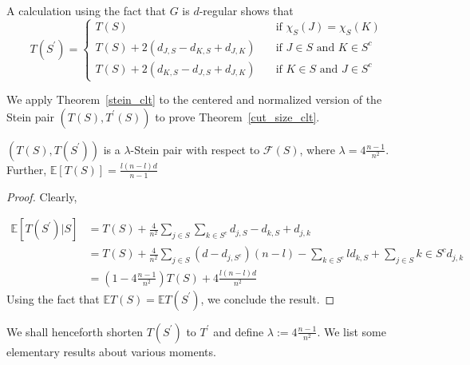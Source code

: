 \documentclass[final,12pt]{colt2018}
\begin{document}
A calculation using the fact that $G$ is $d$-regular shows that
\begin{equation}
T(S^{\prime}) = \begin{cases}
T(S) &\quad \text{if $\chi_S (J) = \chi_S(K)$} \\
T(S) + 2(d_{J,S} - d_{K,S} + d_{J,K}) &\quad \text{if $J \in S$ and $K \in S^{c}$} \\
T(S) + 2(d_{K,S} - d_{J,S} + d_{J,K}) &\quad \text{if $K \in S$ and $J \in S^{c}$}
\end{cases}
\end{equation}

We apply Theorem~\ref{stein_clt} to the centered and normalized version of the Stein pair $(T(S), T^{\prime}(S))$ to prove Theorem~\ref{cut_size_clt}. 

\label{sec:clt_proof}

\begin{lemma}
$(T(S),T(S^{\prime}))$ is a $\lambda$-Stein pair with respect to $\mathcal{F}(S)$, where $\lambda = 4\frac{n-1}{n^2}$. Further, $\mathbb{E}[T(S)] = \tfrac{l(n-l)d}{n-1} $
\label{lem:expectation_stein_pair}
\end{lemma}
\begin{proof}
Clearly,

\begin{align}
\mathbb{E}[T(S^{\prime})|S] &= T(S) + \tfrac{4}{n^2}\sum_{j \in S}\sum_{k\in S^c} d_{j,S} - d_{k,S} + d_{j,k} \\
&= T(S) + \frac{4}{n^2} \sum_{j\in S}(d - d_{j,S^c})(n-l) -  \sum_{k\in S^c} ld_{k,S} + \sum_{j \in S}{k\in S^c} d_{j,k}\\
&= \left(1-4\frac{n-1}{n^2}\right)T(S)  + 4\frac{l(n-l)d}{n^2}
\end{align}
Using the fact that $\mathbb{E}T(S) = \mathbb{E}T(S^{\prime})$, we conclude the result.
\end{proof}
We shall henceforth shorten $T(S^{\prime})$ to $T^{\prime}$ and define $\lambda := 4\frac{n-1}{n^2}$. We list some elementary results about various moments. 
\end{document}
